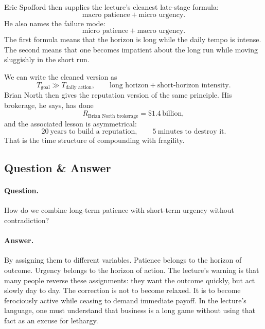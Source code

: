 Eric Spofford then supplies the lecture's cleanest late-stage formula:
\begin{equation}
\text{macro patience} + \text{micro urgency}.
\end{equation}
He also names the failure mode:
\begin{equation}
\text{micro patience} + \text{macro urgency}.
\end{equation}
The first formula means that the horizon is long while the daily tempo is intense. The second means that one becomes impatient about the long run while moving sluggishly in the short run.

We can write the cleaned version as
\begin{equation}
T_{\text{goal}} \gg T_{\text{daily action}},
\qquad
\text{long horizon} + \text{short-horizon intensity}.
\end{equation}
Brian North then gives the reputation version of the same principle. His brokerage, he says, has done
\begin{equation}
R_{\text{Brian North brokerage}} = \$1.4\,\text{billion},
\end{equation}
and the associated lesson is asymmetrical:
\begin{equation}
20\ \text{years to build a reputation},
\qquad
5\ \text{minutes to destroy it}.
\end{equation}
That is the time structure of compounding with fragility.

\subsection{Question \& Answer}

\paragraph{Question.} How do we combine long-term patience with short-term urgency without contradiction?

\paragraph{Answer.} By assigning them to different variables. Patience belongs to the horizon of outcome. Urgency belongs to the horizon of action. The lecture's warning is that many people reverse these assignments: they want the outcome quickly, but act slowly day to day. The correction is not to become relaxed. It is to become ferociously active while ceasing to demand immediate payoff. In the lecture's language, one must understand that business is a long game without using that fact as an excuse for lethargy.

